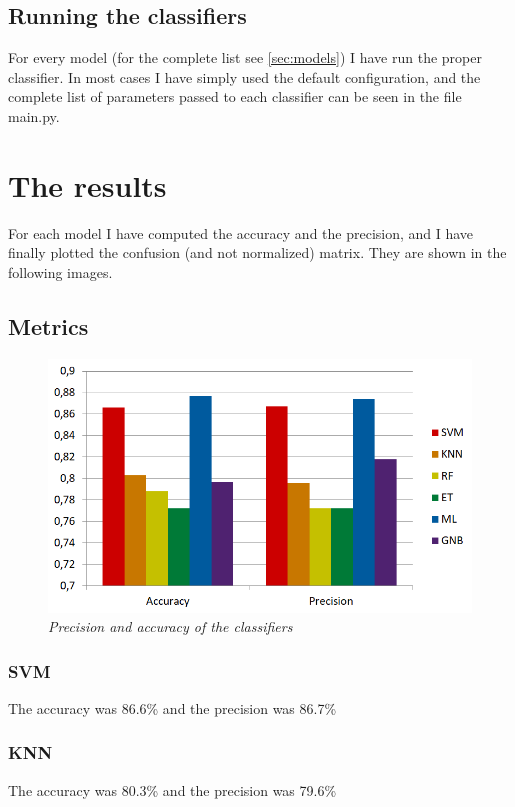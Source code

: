 \documentclass[12pt]{article}
\begin{document}
\subsection{Running the classifiers}
For every model (for the complete list see \ref{sec:models}) I have run the proper classifier. In most cases I have simply used the default configuration, and the complete list of parameters passed to each classifier can be seen in the file main.py.

\section{The results}
\label{sec:results}
For each model I have computed the accuracy and the precision, and I have finally plotted the confusion (and not normalized) matrix. They are shown in the following images.
\subsection{Metrics}
\begin{figure}[!ht]
	\centering %
	\includegraphics[width=1\textwidth]{metrics.png} %
	\caption{\textit{Precision and accuracy of the classifiers}} %
	\label{fig:metrics}
\end{figure}
\subsubsection{SVM}
The accuracy was 86.6\% and the precision was 86.7\%
\subsubsection{KNN}
The accuracy was 80.3\% and the precision was 79.6\%
\end{document}
